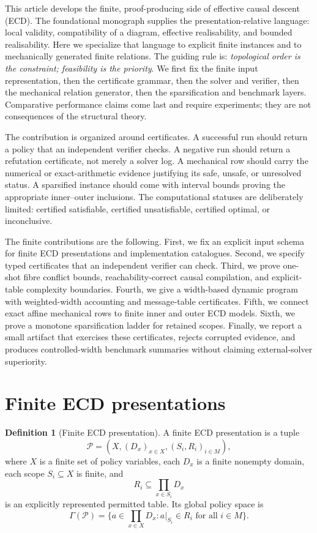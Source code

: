 \documentclass[11pt]{article}
\theoremstyle{plain}
\theoremstyle{definition}
\newtheorem{definition}[theorem]{Definition}
\theoremstyle{remark}
\begin{document}
This article develops the finite, proof-producing side of effective causal
descent (ECD).  The foundational monograph supplies the presentation-relative
language: local validity, compatibility of a diagram, effective realisability,
and bounded realisability.  Here we specialize that language to explicit finite
instances and to mechanically generated finite relations.  The guiding rule is:
\emph{topological order is the constraint; feasibility is the priority}.  We
first fix the finite input representation, then the certificate grammar, then
the solver and verifier, then the mechanical relation generator, then the
sparsification and benchmark layers.  Comparative performance claims come last
and require experiments; they are not consequences of the structural theory.

The contribution is organized around certificates.  A successful run should
return a policy that an independent verifier checks.  A negative run should
return a refutation certificate, not merely a solver log.  A mechanical row
should carry the numerical or exact-arithmetic evidence justifying its safe,
unsafe, or unresolved status.  A sparsified instance should come with interval
bounds proving the appropriate inner--outer inclusions.  The computational
statuses are deliberately limited: certified satisfiable, certified
unsatisfiable, certified optimal, or inconclusive.

The finite contributions are the following.  First, we fix an explicit input
schema for finite ECD presentations and implementation catalogues.  Second, we
specify typed certificates that an independent verifier can check.  Third, we
prove one-shot fibre conflict bounds, reachability-correct causal compilation,
and explicit-table complexity boundaries.  Fourth, we give a width-based dynamic
program with weighted-width accounting and message-table certificates.  Fifth,
we connect exact affine mechanical rows to finite inner and outer ECD models.
Sixth, we prove a monotone sparsification ladder for retained scopes.  Finally,
we report a small artifact that exercises these certificates, rejects corrupted
evidence, and produces controlled-width benchmark summaries without claiming
external-solver superiority.

\section{Finite ECD presentations}
\label{sec:finite-presentations}

\begin{definition}[Finite ECD presentation]
A finite ECD presentation is a tuple
\[
  \mathcal P=(X,(D_x)_{x\in X},(S_i,R_i)_{i\in M}),
\]
where \(X\) is a finite set of policy variables, each \(D_x\) is a finite
nonempty domain, each scope \(S_i\subseteq X\) is finite, and
\[
  R_i\subseteq\prod_{x\in S_i}D_x
\]
is an explicitly represented permitted table.  Its global policy space is
\[
  \Gamma(\mathcal P)=
  \{a\in\prod_{x\in X}D_x: a|_{S_i}\in R_i\text{ for all }i\in M\}.
\]
\end{definition}
\end{document}
